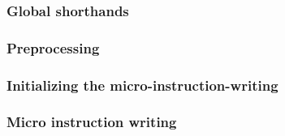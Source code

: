\subsubsection{Global shorthands}                                \label{mmu: instructions: RamToExoWithPadding: global shorthands}                
\subsubsection{Preprocessing}                                    \label{mmu: instructions: RamToExoWithPadding: preprocessing}                    
\subsubsection{Initializing the micro-instruction-writing}       \label{mmu: instructions: RamToExoWithPadding: initialization}                   
\subsubsection{Micro instruction writing}                        \label{mmu: instructions: RamToExoWithPadding: micro instruction writing}        
